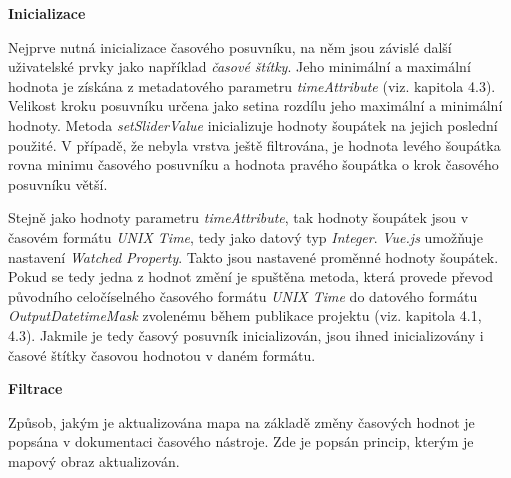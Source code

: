 \bigskip
\noindent \textbf{Inicializace}

Nejprve nutná inicializace časového posuvníku, na něm jsou závislé další uživatelské prvky jako například \textit{časové štítky}. Jeho minimální a maximální hodnota je získána z metadatového parametru \textit{timeAttribute} (viz. kapitola 4.3). Velikost kroku posuvníku určena jako setina rozdílu jeho maximální a minimální hodnoty. Metoda \textit{setSliderValue} inicializuje hodnoty šoupátek na jejich poslední použité. V případě, že nebyla vrstva ještě filtrována, je hodnota levého šoupátka rovna minimu časového posuvníku a hodnota pravého šoupátka o krok časového posuvníku větší. 

Stejně jako hodnoty parametru \textit{timeAttribute}, tak hodnoty šoupátek jsou v časovém formátu \textit{UNIX Time}, tedy jako datový typ \textit{Integer}. \textit{Vue.js} umožňuje nastavení \textit{Watched Property}. Takto jsou nastavené proměnné hodnoty šoupátek. Pokud se tedy jedna z hodnot změní je spuštěna metoda, která provede převod původního celočíselného časového formátu \textit{UNIX Time} do datového formátu \textit{OutputDatetimeMask} zvolenému během publikace projektu (viz. kapitola 4.1, 4.3). Jakmile je tedy časový posuvník inicializován, jsou ihned inicializovány i časové štítky časovou hodnotou v daném formátu.

\bigskip
\noindent \textbf{Filtrace}


Způsob, jakým je aktualizována mapa na základě změny časových hodnot je popsána v dokumentaci časového nástroje. Zde je popsán princip, kterým je mapový obraz aktualizován.

